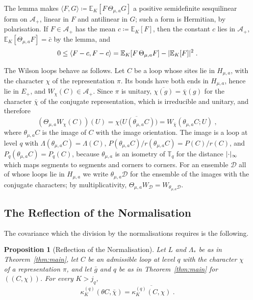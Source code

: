 \documentclass[11pt]{preprint}
\DeclarePairedDelimiter{\abs}{\lvert}{\rvert}
\numberwithin{equation}{section}
\newtheorem{proposition}[theorem]{Proposition}
\theoremstyle{definition}
\theoremstyle{remark}
\theoremstyle{plain}
\begin{document}
The lemma makes $\langle F, G\rangle \coloneqq \mathbb E_K[F\,\Theta_{\mu,a}G]$ a positive semidefinite sesquilinear form on $\mathcal A_+$, linear in $F$ and antilinear in $G$; such a form is Hermitian, by polarisation. If $F \in \mathcal A_+$ has the mean $c \coloneqq \mathbb E_K[F]$, then the constant $c$ lies in $\mathcal A_+$, $\mathbb E_K[\Theta_{\mu,a}F] = \bar c$ by the lemma, and
\begin{equation}\label{eq:reflection-covariance}
    0 \leq \langle F - c, F - c\rangle = \mathbb E_K[F\,\Theta_{\mu,a}F] - \abs{\mathbb E_K[F]}^2\;.
\end{equation}

The Wilson loops behave as follows. Let $C$ be a loop whose sites lie in $H_{\mu,a}$, with the character $\chi$ of the representation $\pi$. Its bonds have both ends in $H_{\mu,a}$, hence lie in $E_+$, and $W_\chi(C) \in \mathcal A_+$. Since $\pi$ is unitary, $\overline{\chi(g)} = \bar\chi(g)$ for the character $\bar\chi$ of the conjugate representation, which is irreducible and unitary, and therefore
\begin{equation}\label{eq:reflected-loop}
    (\Theta_{\mu,a}W_\chi(C))(U) = \overline{\chi\bigl(U(\theta_{\mu,a}C)\bigr)} = W_{\bar\chi}(\theta_{\mu,a}C; U)\;,
\end{equation}
where $\theta_{\mu,a}C$ is the image of $C$ with the image orientation. The image is a loop at level $q$ with $\Lambda(\theta_{\mu,a}C) = \Lambda(C)$, $P(\theta_{\mu,a}C)/r(\theta_{\mu,a}C) = P(C)/r(C)$, and $P_q(\theta_{\mu,a}C) = P_q(C)$, because $\theta_{\mu,a}$ is an isometry of $\mathbb T_q$ for the distance $\abs{\cdot}_\infty$ which maps segments to segments and corners to corners. For an ensemble $\mathcal D$ all of whose loops lie in $H_{\mu,a}$ we write $\theta_{\mu,a}\mathcal D$ for the ensemble of the images with the conjugate characters; by multiplicativity, $\Theta_{\mu,a}W_{\mathcal D} = W_{\theta_{\mu,a}\mathcal D}$.

\subsection{The Reflection of the Normalisation}\label{sec:reflection-normalisation}

The covariance which the division by the normalisations requires is the following.

\begin{proposition}[Reflection of the Normalisation]\label{prop:reflection-normalisation}
Let $L$ and $\Lambda_*$ be as in Theorem~\ref{thm:main}, let $C$ be an admissible loop at level $q$ with the character $\chi$ of a representation $\pi$, and let $\bar g$ and $q$ be as in Theorem~\ref{thm:main} for $((C, \chi))$. For every $K > j_q$,
\begin{equation}\label{eq:reflection-normalisation}
    \kappa^{(q)}_K(\theta C, \bar\chi) = \overline{\kappa^{(q)}_K(C, \chi)}\;.
\end{equation}
\end{proposition}
\end{document}
